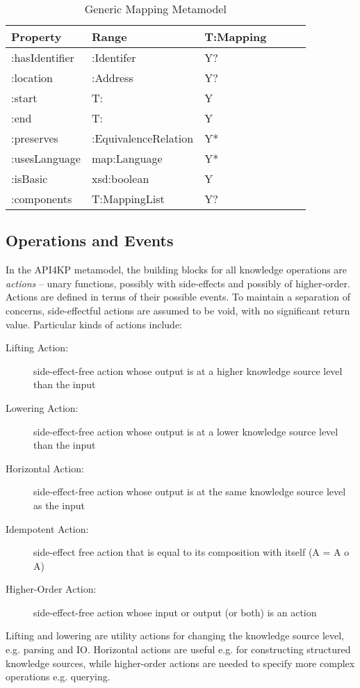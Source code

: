 \documentclass[runningheads]{llncs}
\begin{document}
\begin{table}[h]
\centering
\begin{tabular}{|l|l|l|l|l|l|}
 \hline
\textbf{Property} & \textbf{Range} & \textbf{T:Mapping}   \\ \hline
:hasIdentifier    & :Identifer     &  Y?                       \\ \hline
:location         & :Address       &  Y?                       \\ \hline
:start          & T:               &  Y                       \\ \hline
:end            & T:               &  Y                       \\ \hline
:preserves        & :EquivalenceRelation    &  Y*              \\ \hline
:usesLanguage     & map:Language    &  Y*              \\ \hline
:isBasic         & xsd:boolean     &  Y              \\ \hline
:components      & T:MappingList     &  Y?              \\ \hline
\end{tabular}
\caption{Generic Mapping Metamodel}
\label{krmaponto}
\end{table}

\subsection{Operations and Events}
\label{sec:op}

In the API4KP metamodel, the building blocks for all knowledge operations are \emph{actions} -- unary functions, possibly with side-effects and possibly of higher-order. Actions are defined in terms of their possible events. To maintain a separation of concerns, side-effectful actions are assumed to be void, with no significant return value. Particular kinds of actions include:

\begin{description}
      \item[Lifting Action:] side-effect-free action whose output is at a higher knowledge source level than the input
      \item[Lowering Action:]  side-effect-free action whose output is at a lower knowledge source level than the input
      \item[Horizontal Action:] side-effect-free action whose output is at the same knowledge source level as the input
      \item[Idempotent Action:] side-effect free action that is equal to its composition with itself (A = A o A)
      \item[Higher-Order Action:] side-effect-free action whose input or output (or both) is an action
\end{description}
Lifting and lowering are utility actions for changing the knowledge source level, e.g. parsing and IO. 
Horizontal actions are useful e.g. for constructing structured knowledge sources, while higher-order actions are needed to specify more complex operations e.g. querying.
\end{document}
